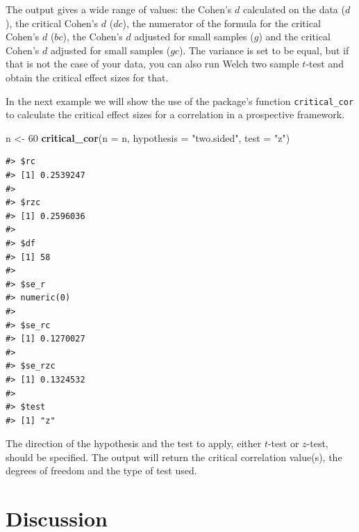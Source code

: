 \documentclass[
  man]{apa7}
\newenvironment{Shaded}{\begin{snugshade}}{\end{snugshade}}
\newcommand{\AttributeTok}[1]{\textcolor[rgb]{0.13,0.29,0.53}{#1}}
\newcommand{\DecValTok}[1]{\textcolor[rgb]{0.00,0.00,0.81}{#1}}
\newcommand{\FunctionTok}[1]{\textcolor[rgb]{0.13,0.29,0.53}{\textbf{#1}}}
\newcommand{\NormalTok}[1]{#1}
\newcommand{\OtherTok}[1]{\textcolor[rgb]{0.56,0.35,0.01}{#1}}
\newcommand{\StringTok}[1]{\textcolor[rgb]{0.31,0.60,0.02}{#1}}
\begin{document}
\normalsize

The output gives a wide range of values: the Cohen's \(d\) calculated on the data (\(d\)), the critical Cohen's \(d\) (\(dc\)), the numerator of the formula for the critical Cohen's \(d\) (\(bc\)), the Cohen's \(d\) adjusted for small samples (\(g\)) and the critical Cohen's \(d\) adjusted for small samples (\(gc\)). The variance is set to be equal, but if that is not the case of your data, you can also run Welch two sample \(t\)-test and obtain the critical effect sizes for that.

In the next example we will show the use of the package's function \texttt{critical\_cor} to calculate the critical effect sizes for a correlation in a prospective framework.

\footnotesize

\begin{Shaded}
\begin{Highlighting}[]
\NormalTok{n }\OtherTok{\textless{}{-}} \DecValTok{60}
\FunctionTok{critical\_cor}\NormalTok{(}\AttributeTok{n =}\NormalTok{ n, }\AttributeTok{hypothesis =} \StringTok{"two.sided"}\NormalTok{, }\AttributeTok{test =} \StringTok{"z"}\NormalTok{)}
\end{Highlighting}
\end{Shaded}

\begin{verbatim}
#> $rc
#> [1] 0.2539247
#> 
#> $rzc
#> [1] 0.2596036
#> 
#> $df
#> [1] 58
#> 
#> $se_r
#> numeric(0)
#> 
#> $se_rc
#> [1] 0.1270027
#> 
#> $se_rzc
#> [1] 0.1324532
#> 
#> $test
#> [1] "z"
\end{verbatim}

\normalsize

The direction of the hypothesis and the test to apply, either \(t\)-test or \(z\)-test, should be specified. The output will return the critical correlation value(s), the degrees of freedom and the type of test used.

\hypertarget{discussion}{%
\section{Discussion}\label{discussion}}
\end{document}
